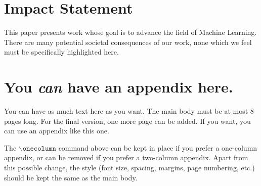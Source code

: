 \documentclass{article}
\theoremstyle{plain}
\theoremstyle{definition}
\theoremstyle{remark}
\begin{document}
\section*{Impact Statement}
This paper presents work whose goal is to advance the field of 
Machine Learning. There are many potential societal consequences 
of our work, none which we feel must be specifically highlighted here.




\newpage
\appendix
\onecolumn
\section{You \emph{can} have an appendix here.}

You can have as much text here as you want. The main body must be at most $8$ pages long.
For the final version, one more page can be added.
If you want, you can use an appendix like this one.  

The $\mathtt{\backslash onecolumn}$ command above can be kept in place if you prefer a one-column appendix, or can be removed if you prefer a two-column appendix.  Apart from this possible change, the style (font size, spacing, margins, page numbering, etc.) should be kept the same as the main body.
\end{document}

